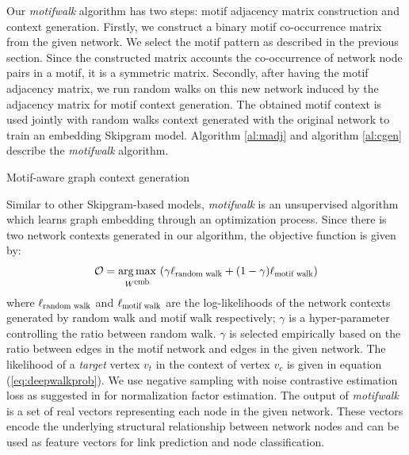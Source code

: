 \documentclass{article}
\DeclareMathOperator*{\argmax}{arg\,max}
\theoremstyle{definition}
\begin{document}
Our \emph{motifwalk} algorithm has two steps: motif adjacency matrix
construction and context generation. Firstly, we construct a binary
motif co-occurrence matrix from the given network. We select the motif
pattern as described in the previous section. Since the constructed matrix
accounts the co-occurrence of network node pairs in a motif, it is a
symmetric matrix. Secondly, after having the motif adjacency matrix,
we run random walks on this new network induced by the adjacency matrix
for motif context generation. The obtained motif context is used jointly
with random walks context generated with the original network to train an
embedding Skipgram model. Algorithm \ref{al:madj} and algorithm
\ref{al:cgen} describe the \emph{motifwalk} algorithm.
\begin{algorithm}[h] \label{al:cgen}
\caption{Motif-aware graph context generation}
\end{algorithm}

Similar to other Skipgram-based models, \emph{motifwalk} is an unsupervised
algorithm which learns graph embedding through an optimization process.
Since there is two network contexts generated in our algorithm, the
objective function is given by:
\begin{equation}
\begin{aligned}
&\mathcal{O} = \argmax_{W^{\scalebox{0.75}{emb}}}\ (\gamma
\ell_{\scalebox{0.75}{random walk}} + (1-\gamma) \ell_{\scalebox{0.75}
{motif walk}}) \\
\end{aligned}
\label{eq:mloss}
\end{equation}
where $\ell_{\scalebox{0.75}{random walk}}$ and $\ell_{\scalebox{0.75}
{motif walk}}$
are the log-likelihoods of the network contexts generated by
random walk and motif walk respectively; $\gamma$ is a hyper-parameter
controlling the ratio between random walk. $\gamma$ is selected
empirically based on the ratio between edges in the motif network and edges
in the given network. The likelihood
of a \emph{target} vertex $v_t$ in the context of vertex $v_c$ is given
in equation (\ref{eq:deepwalkprob}). We use negative sampling with noise
contrastive estimation loss as suggested in \cite{skipgram} for normalization
factor estimation. The output of \emph{motifwalk} is a set of real
vectors representing each node in the given network. These vectors encode
the underlying structural relationship between network nodes and can be used as
feature vectors for link prediction and node classification.
\end{document}
